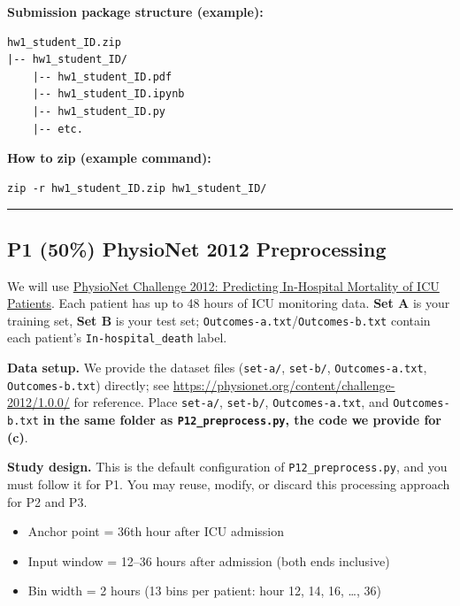 \documentclass{article}
\begin{document}
\vspace{1em}
{\normalsize\textbf{Submission package structure (example):}}

\begin{verbatim}
hw1_student_ID.zip
|-- hw1_student_ID/
    |-- hw1_student_ID.pdf
    |-- hw1_student_ID.ipynb
    |-- hw1_student_ID.py
    |-- etc.
\end{verbatim}

\vspace{0.5em}
{\normalsize\textbf{How to zip (example command):}}
\begin{verbatim}
zip -r hw1_student_ID.zip hw1_student_ID/
\end{verbatim}

\hrule


\subsection*{P1 (50\%) \textbf{PhysioNet 2012 Preprocessing}}

We will use \href{https://physionet.org/content/challenge-2012/1.0.0/}{PhysioNet Challenge 2012: Predicting In-Hospital Mortality of ICU Patients}. Each patient has up to 48 hours of ICU monitoring data. \textbf{Set A} is your training set, \textbf{Set B} is your test set; \texttt{Outcomes-a.txt}/\texttt{Outcomes-b.txt} contain each patient's \texttt{In-hospital\_death} label.

\textbf{Data setup.} We provide the dataset files (\texttt{set-a/}, \texttt{set-b/}, \texttt{Outcomes-a.txt}, \texttt{Outcomes-b.txt}) directly; see \url{https://physionet.org/content/challenge-2012/1.0.0/} for reference. Place \texttt{set-a/}, \texttt{set-b/}, \texttt{Outcomes-a.txt}, and \texttt{Outcomes-b.txt} \textbf{in the same folder as \texttt{P12\_preprocess.py}, the code we provide for (c)}.

\textbf{Study design.} This is the default configuration of \texttt{P12\_preprocess.py}, and you must follow it for P1. You may reuse, modify, or discard this processing approach for P2 and P3.
\begin{itemize}
    \item Anchor point = 36th hour after ICU admission
    \item Input window = 12--36 hours after admission (both ends inclusive)
    \item Bin width = 2 hours (13 bins per patient: hour 12, 14, 16, \ldots, 36)
\end{itemize}
\end{document}
